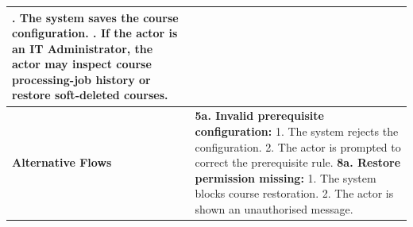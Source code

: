 \begin{longtable}{|>{\raggedright\arraybackslash}p{}|>{\raggedright\arraybackslash}p{}|}
7. The system saves the course configuration. \newline
8. If the actor is an IT Administrator, the actor may inspect course processing-job history or restore soft-deleted courses. \\ \hline
\textbf{Alternative Flows} &
\textbf{5a. Invalid prerequisite configuration:} \newline
\hspace*{1em}1. The system rejects the configuration. \newline
\hspace*{1em}2. The actor is prompted to correct the prerequisite rule. \newline
\textbf{8a. Restore permission missing:} \newline
\hspace*{1em}1. The system blocks course restoration. \newline
\hspace*{1em}2. The actor is shown an unauthorised message. \\
\end{longtable}

